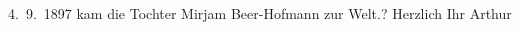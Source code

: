 \begin{ledgroupsized}[t]{13cm}
{{{                     4. 9. 1897 kam die Tochter Mirjam
                     Beer-Hofmann zur Welt.}}}\label{K_L00721_3h}?\pend
           \pstart Herzlich Ihr \spacefill\mbox{Arthur}\pend{}\endnumbering{}\end{ledgroupsized}  \newcommand{\dateiname}{L00721}\newcommand{\titel}{Arthur Schnitzler an Richard Beer-Hofmann, 31. 8. 1897}\newcommand{\editorInnen}{ Martin Anton Müller und Gerd-Hermann Susen}
            \footnotesize
\begin{ledgroupsized}[t]{11.5cm}
\end{ledgroupsized}
         
      
